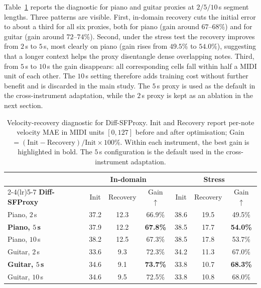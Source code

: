 Table~\ref{tab:bp_proxy_recovery} reports the diagnostic for piano and guitar proxies at $2/5/10$\,s segment lengths. Three patterns are visible. First, in-domain recovery cuts the initial error to about a third for all six proxies, both for piano (gain around $67$--$68\%$) and for guitar (gain around $72$--$74\%$). Second, under the stress test the recovery improves from $2$\,s to $5$\,s, most clearly on piano (gain rises from $49.5\%$ to $54.0\%$), suggesting that a longer context helps the proxy disentangle dense overlapping notes. Third, from $5$\,s to $10$\,s the gain disappears: all corresponding cells fall within half a MIDI unit of each other. The $10$\,s setting therefore adds training cost without further benefit and is discarded in the main study. The $5$\,s proxy is used as the default in the cross-instrument adaptation, while the $2$\,s proxy is kept as an ablation in the next section.

\begin{table}[!h]
\caption{Velocity-recovery diagnostic for Diff-SFProxy. Init and Recovery report per-note velocity MAE in MIDI units $[0, 127]$ before and after optimisation; Gain $= (\text{Init} - \text{Recovery})/\text{Init} \times 100\%$. Within each instrument, the best gain is highlighted in bold. The $5$\,s configuration is the default used in the cross-instrument adaptation.}
\label{tab:bp_proxy_recovery}
\centering
\setlength{\tabcolsep}{15pt} 
\fontsize{11pt}{13pt}\selectfont 
\renewcommand{\arraystretch}{1.2}
\begin{tabular}{l||ccc|ccc}
\toprule
& \multicolumn{3}{c}{\textbf{In-domain}} & \multicolumn{3}{c}{\textbf{Stress}} \\
\cmidrule(lr){2-4}\cmidrule(lr){5-7}
\textbf{Diff-SFProxy} & Init & Recovery & Gain $\uparrow$ & Init & Recovery & Gain $\uparrow$ \\
\midrule
Piano,  $2$\,s  & 37.2 & 12.3 & 66.9\% & 38.6 & 19.5 & 49.5\% \\
\textbf{Piano,  $5$\,s}  & 37.9 & 12.2 & \textbf{67.8\%} & 38.5 & 17.7 & \textbf{54.0\%} \\
Piano,  $10$\,s & 38.2 & 12.5 & 67.3\% & 38.5 & 17.8 & 53.7\% \\
\midrule
Guitar, $2$\,s  & 33.6 &  9.3 & 72.3\% & 34.2 & 11.3 & 67.0\% \\
\textbf{Guitar, $5$\,s}  & 34.6 &  9.1 & \textbf{73.7\%} & 33.8 & 10.7 & \textbf{68.3\%} \\
Guitar, $10$\,s & 34.6 &  9.5 & 72.5\% & 33.8 & 10.8 & 68.0\% \\
\bottomrule
\end{tabular}
\end{table}


